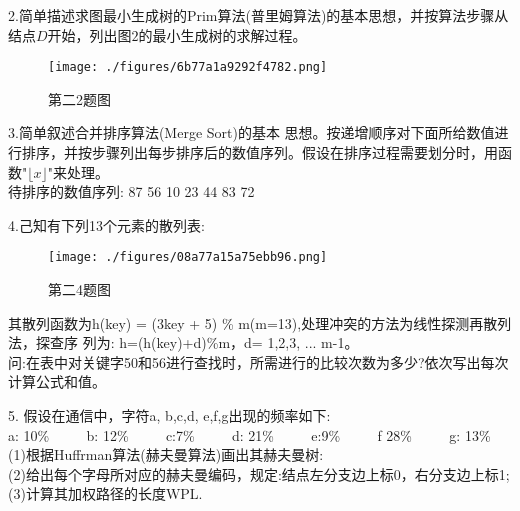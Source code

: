 2.简单描述求图最小生成树的Prim算法(普里姆算法)的基本思想，并按算法步骤从结点$D$开始，列出图$2$的最小生成树的求解过程。
\begin{figure}[ht]
\centering
\texttt{[image: ./figures/6b77a1a9292f4782.png]}
\caption{第二2题图} \label{fig_SYDS14_2}
\end{figure}

3.简单叙述合并排序算法(Merge Sort)的基本 思想。按递增顺序对下面所给数值进行排序，并按步骤列出每步排序后的数值序列。假设在排序过程需要划分时，用函数"$\lfloor x \rfloor$"来处理。 \\
待排序的数值序列: 87 56 10 23 44 83 72

4.己知有下列13个元素的散列表:
\begin{figure}[ht]
\centering
\texttt{[image: ./figures/08a77a15a75ebb96.png]}
\caption{第二4题图} \label{fig_SYDS14_3}
\end{figure}
其散列函数为h(key) = (3key + 5) \% m(m=13),处理冲突的方法为线性探测再散列法，探查序
列为: h=(h(key)+d)\%m，d= 1,2,3, ... m-1。 \\
问:在表中对关键字50和56进行查找时，所需进行的比较次数为多少?依次写出每次计算公式和值。

5. 假设在通信中，字符a, b,c,d, e,f,g出现的频率如下: \\
a: 10\% $\qquad$ b: 12\% $\qquad$ c:7\% $\qquad$ d: 21\% $\qquad$ e:9\% $\qquad$ f 28\% $\qquad$ g: 13\% \\
(1)根据Huffrman算法(赫夫曼算法)画出其赫夫曼树: \\
(2)给出每个字母所对应的赫夫曼编码，规定:结点左分支边上标0，右分支边上标1; \\
(3)计算其加权路径的长度WPL.

